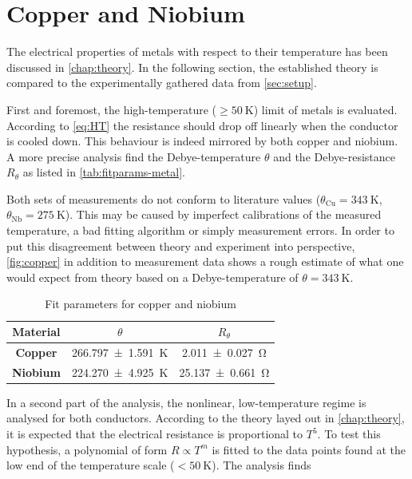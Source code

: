 
\section{Copper and Niobium}
\label{sec:metals}

The electrical properties of metals with respect to their temperature has been
discussed in \autoref{chap:theory}. In the following section, the established theory is compared to the experimentally gathered data from \autoref{sec:setup}.

First and foremost, the high-temperature ($\geq\SI{50}{\kelvin}$) limit of metals is
evaluated. According to \autoref{eq:HT} the resistance should drop off linearly when
the conductor is cooled down. This behaviour is indeed mirrored by both copper and
niobium. A more precise analysis find the Debye-temperature $\theta$ and the
Debye-resistance $R_\theta$ as listed in \autoref{tab:fitparams-metal}.

Both sets of measurements do not conform to literature values ($\theta_\text{Cu}
=\SI{343}{\kelvin}$, $\theta_\text{Nb}=\SI{275}{\kelvin}$). This may be caused by
imperfect calibrations of the measured temperature, a bad fitting algorithm or simply
measurement errors. In order to put this disagreement between theory and experiment
into perspective, \autoref{fig:copper} in addition to measurement data shows a
rough estimate of what one would expect from theory based on a Debye-temperature of
$\theta = \SI{343}{\kelvin}$.

\begingroup
\renewcommand{\arraystretch}{1.3}
\begin{table}
	\begin{center}
	\caption{Fit parameters for copper and niobium}
	\begin{tabular*}{0.7\textwidth}{@{\extracolsep{\fill}} ccc}
  \toprule
	\hline
  Material & $\theta$ & $R_\theta$  \\
	\hline
  \textbf{Copper} & \SI{266.797\pm1.591}{\kelvin} & \SI{2.011\pm0.027}{\ohm} \\
  \textbf{Niobium} & \SI{224.270\pm4.925}{\kelvin} & \SI{25.137\pm0.661}{\ohm} \\
  \bottomrule
	\end{tabular*}
	\label{tab:fitparams-metal}
	\end{center}
\end{table}
\endgroup

In a second part of the analysis, the nonlinear, low-temperature regime is analysed
for both conductors. According to the theory layed out in \autoref{chap:theory}, it
is expected that the electrical resistance is proportional to $T^5$. To test this
hypothesis, a polynomial of form $R\propto T^m$ is fitted to the data points found at
the low end of the temperature scale ($<\SI{50}{\kelvin}$). The analysis finds

